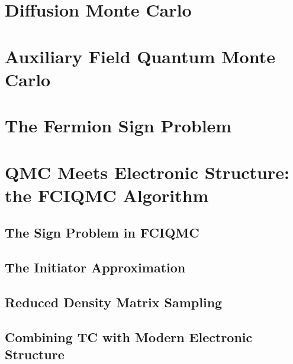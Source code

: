 \section{Diffusion Monte Carlo}

\section{Auxiliary Field Quantum Monte Carlo}

\section{The Fermion Sign Problem}

\section{QMC Meets Electronic Structure: the FCIQMC Algorithm}

\subsection{The Sign Problem in FCIQMC}

\subsection{The Initiator Approximation}

\subsection{Reduced Density Matrix Sampling}

\subsection{Combining TC with Modern Electronic Structure}

